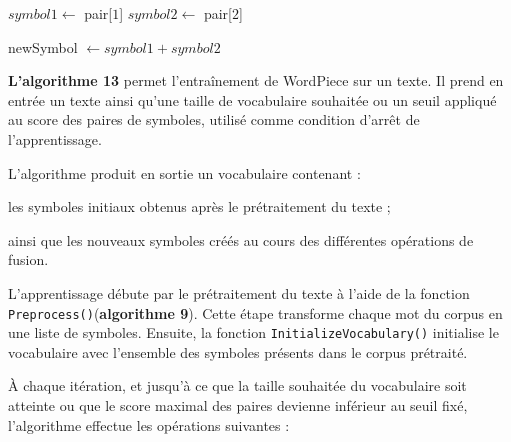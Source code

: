 \documentclass[12pt,a4paper]{report}
\begin{document}
	\begin{algorithm}[H]
		\caption{MergePair}
		
		
		$symbol1 \leftarrow$ pair[$1$]\;
		$symbol2 \leftarrow$ pair[$2$]\;
		
		
		newSymbol $\leftarrow symbol1 + symbol2$
		
		
	\end{algorithm}
	
	\vspace{0.5cm}
	
	\textbf{L’algorithme 13} permet l’entraînement de WordPiece sur un texte. Il prend en entrée un texte ainsi qu’une taille de vocabulaire souhaitée ou un seuil appliqué au score des paires de symboles, utilisé comme condition d’arrêt de l’apprentissage.
	
	L’algorithme produit en sortie un vocabulaire contenant :
	
	\begin{itemizeFB}
		\item les symboles initiaux obtenus après le prétraitement du texte ;
		\item ainsi que les nouveaux symboles créés au cours des différentes opérations de fusion.
	\end{itemizeFB}

	L’apprentissage débute par le prétraitement du texte à l’aide de la fonction \texttt{Preprocess()}(\textbf{algorithme 9}). Cette étape transforme chaque mot du corpus en une liste de symboles. Ensuite, la fonction \texttt{InitializeVocabulary()} initialise le vocabulaire avec l’ensemble des symboles présents dans le corpus prétraité.
	
	À chaque itération, et jusqu’à ce que la taille souhaitée du vocabulaire soit atteinte ou que le score maximal des paires devienne inférieur au seuil fixé, l’algorithme effectue les opérations suivantes :
	
\end{document}
